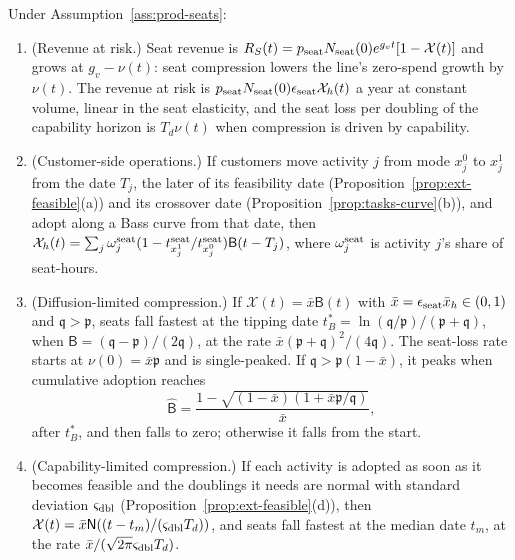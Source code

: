 \begin{proposition}\label{prop:prod-seats}
Under Assumption~\ref{ass:prod-seats}:
\begin{enumerate}
\item[(a)] (Revenue at risk.) Seat revenue is $R_S(t)=p_{\rm seat}N_{\rm seat}(0)e^{g_vt}[1-\mathcal X(t)]$ and grows at $g_v-\nu(t)$: seat compression lowers the line's zero-spend growth by $\nu(t)$. The revenue at risk is $p_{\rm seat}N_{\rm seat}(0)\epsilon_{\rm seat}\mathcal X_h(t)$ a year at constant volume, linear in the seat elasticity, and the seat loss per doubling of the capability horizon is $T_d\nu(t)$ when compression is driven by capability.
\item[(b)] (Customer-side operations.) If customers move activity $j$ from mode $x^0_j$ to $x^1_j$ from the date $T_j$, the later of its feasibility date (Proposition~\ref{prop:ext-feasible}(a)) and its crossover date (Proposition~\ref{prop:tasks-curve}(b)), and adopt along a Bass curve from that date, then $\mathcal X_h(t)=\sum_j\omega^{\rm seat}_j(1-t^{\rm seat}_{x^1_j}/t^{\rm seat}_{x^0_j})\mathsf B(t-T_j)$, where $\omega^{\rm seat}_j$ is activity $j$'s share of seat-hours.
\item[(c)] (Diffusion-limited compression.) If $\mathcal X(t)=\bar x\mathsf B(t)$ with $\bar x=\epsilon_{\rm seat}\bar x_h\in(0,1)$ and $\mathfrak q>\mathfrak p$, seats fall fastest at the tipping date $t^*_B=\ln(\mathfrak q/\mathfrak p)/(\mathfrak p+\mathfrak q)$, when $\mathsf B=(\mathfrak q-\mathfrak p)/(2\mathfrak q)$, at the rate $\bar x(\mathfrak p+\mathfrak q)^2/(4\mathfrak q)$. The seat-loss rate starts at $\nu(0)=\bar x\mathfrak p$ and is single-peaked. If $\mathfrak q>\mathfrak p(1-\bar x)$, it peaks when cumulative adoption reaches
\begin{equation}\label{eq:prod-Bhat}
\hat{\mathsf B}=\frac{1-\sqrt{(1-\bar x)(1+\bar x\mathfrak p/\mathfrak q)}}{\bar x},
\end{equation}
after $t^*_B$, and then falls to zero; otherwise it falls from the start.
\item[(d)] (Capability-limited compression.) If each activity is adopted as soon as it becomes feasible and the doublings it needs are normal with standard deviation $\varsigma_{\rm dbl}$ (Proposition~\ref{prop:ext-feasible}(d)), then $\mathcal X(t)=\bar x\mathsf N((t-t_m)/(\varsigma_{\rm dbl}T_d))$, and seats fall fastest at the median date $t_m$, at the rate $\bar x/(\sqrt{2\pi}\varsigma_{\rm dbl}T_d)$.
\end{enumerate}
\end{proposition}

